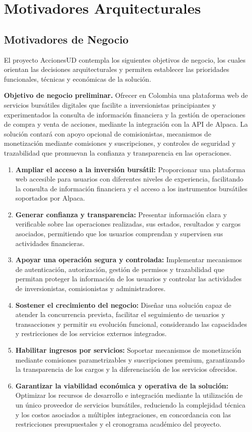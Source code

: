 \documentclass[11pt,a4paper,oneside]{article}
\begin{document}
\section{Motivadores Arquitecturales}
\subsection{Motivadores de Negocio}
El proyecto AccionesUD contempla los siguientes objetivos de negocio, los cuales orientan las decisiones arquitecturales y permiten establecer las prioridades funcionales, técnicas y económicas de la solución.

\textbf{Objetivo de negocio preliminar.} Ofrecer en Colombia una plataforma web de servicios bursátiles digitales que facilite a inversionistas principiantes y experimentados la consulta de información financiera y la gestión de operaciones de compra y venta de acciones, mediante la integración con la API de Alpaca. La solución contará con apoyo opcional de comisionistas, mecanismos de monetización mediante comisiones y suscripciones, y controles de seguridad y trazabilidad que promuevan la confianza y transparencia en las operaciones.
\begin{enumerate}
    \item \textbf{Ampliar el acceso a la inversión bursátil:} Proporcionar una plataforma web accesible para usuarios con diferentes niveles de experiencia, facilitando la consulta de información financiera y el acceso a los instrumentos bursátiles soportados por Alpaca.
    \item \textbf{Generar confianza y transparencia:}  Presentar información clara y verificable sobre las operaciones realizadas, sus estados, resultados y cargos asociados, permitiendo que los usuarios comprendan y supervisen sus actividades financieras.
    \item \textbf{Apoyar una operación segura y controlada:} Implementar mecanismos de autenticación, autorización, gestión de permisos y trazabilidad que permitan proteger la información de los usuarios y controlar las actividades de inversionistas, comisionistas y administradores.
    \item \textbf{Sostener el crecimiento del negocio:} Diseñar una solución capaz de atender la concurrencia prevista, facilitar el seguimiento de usuarios y transacciones y permitir su evolución funcional, considerando las capacidades y restricciones de los servicios externos integrados.
    \item \textbf{Habilitar ingresos por servicios:} Soportar mecanismos de monetización mediante comisiones parametrizables y suscripciones premium, garantizando la transparencia de los cargos y la diferenciación de los servicios ofrecidos.
    \item \textbf{Garantizar la viabilidad económica y operativa de la solución:} Optimizar los recursos de desarrollo e integración mediante la utilización de un único proveedor de servicios bursátiles, reduciendo la complejidad técnica y los costos asociados a múltiples integraciones, en concordancia con las restricciones presupuestales y el cronograma académico del proyecto.
\end{enumerate}
\end{document}
